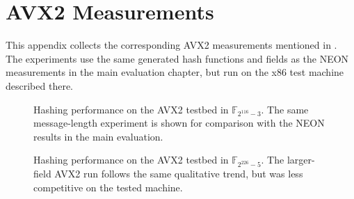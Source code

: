 \chapter{AVX2 Measurements}
\label{app:avx2-measurements}

This appendix collects the corresponding AVX2 measurements mentioned in . The experiments use the same generated hash functions and fields as the NEON measurements in the main evaluation chapter, but run on the x86 test machine described there.

\begin{figure}[!htbp]
    \centering
    \resizebox{\textwidth}{!}{%
        
    }
    \caption{Hashing performance on the AVX2 testbed in \(\mathbb{F}_{2^{116}-3}\). The same message-length experiment is shown for comparison with the NEON results in the main evaluation.}
    \label{fig:avx2-hashing-gf1163}
\end{figure}
\clearpage

\begin{figure}[!htbp]
    \centering
    \resizebox{\textwidth}{!}{%
        
    }
    \caption{Hashing performance on the AVX2 testbed in \(\mathbb{F}_{2^{226}-5}\). The larger-field AVX2 run follows the same qualitative trend, but was less competitive on the tested machine.}
    \label{fig:avx2-hashing-gf2265}
\end{figure}
\clearpage
